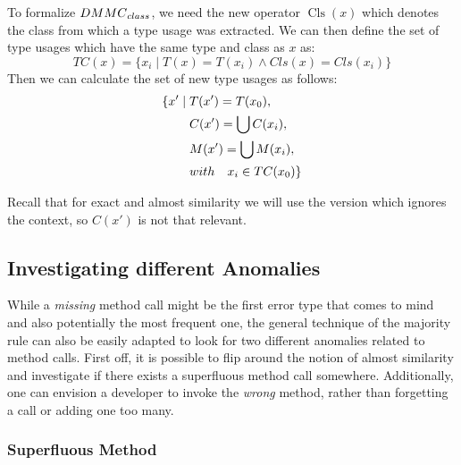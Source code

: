 To formalize $\mathnormal{DMMC}_{\mathnormal{class}}$, we need the new operator $\operatorname{Cls}(x)$ which denotes the class from which a type usage was extracted.
We can then define the set of type usages which have the same type and class as $x$ as:
\begin{equation*}
    TC(x) = \{ x_i \mid T(x) = T(x_i) \land Cls(x) = Cls(x_i) \}
\end{equation*}
Then we can calculate the set of new type usages as follows:
\begin{align*}
    \{ x' \mid \;  & T(x') = T(x_0),\\
                & C(x') = \bigcup{C(x_i)},\\
                & M(x') = \bigcup{M(x_i)},\\
                & \mathnormal{with} \quad x_i \in TC(x_0) \}
\end{align*}

Recall that for exact and almost similarity we will use the version which ignores the context, so $C(x')$ is not that relevant.

\subsection{Investigating different Anomalies}

While a \emph{missing} method call might be the first error type that comes to mind and also potentially the most frequent one, the general technique of the majority rule can also be easily adapted to look for two different anomalies related to method calls.
First off, it is possible to flip around the notion of almost similarity and investigate if there exists a superfluous method call somewhere.
Additionally, one can envision a developer to invoke the \emph{wrong} method, rather than forgetting a call or adding one too many.


\subsubsection{Superfluous Method}

